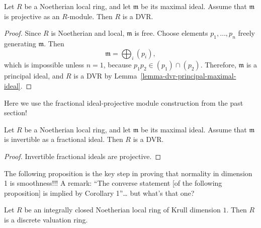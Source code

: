 \begin{proposition}
\label{proposition-projective-maximal-ideal-dvr}
Let $R$ be a Noetherian local ring, and let
$\mathfrak{m}$ be its maximal ideal. Assume
that $\mathfrak{m}$ is projective as an
$R$-module. Then $R$ is a DVR.
\end{proposition}

\begin{proof}
Since $R$ is Noetherian and local,
$\mathfrak{m}$ is free. Choose elements
$p_1,\dots,p_n$ freely generating
$\mathfrak{m}$. Then
$$
\mathfrak{m}=\bigoplus_i (p_i),
$$
which is impossible unless $n=1$, because
$p_1p_2\in (p_1)\cap(p_2)$. Therefore,
$\mathfrak{m}$ is a principal ideal, and
$R$ is a DVR by Lemma~\ref{lemma-dvr-principal-maximal-ideal}.
\end{proof}

\noindent
Here we use the fractional ideal-projective
module construction from the past section!

\begin{corollary}
\label{lemma-invertible-maximal-ideal-dvr}
Let $R$ be a Noetherian local ring, and let
$\mathfrak{m}$ be its maximal ideal. Assume
that $\mathfrak{m}$ is invertible as a
fractional ideal. Then $R$ is a DVR.
\end{corollary}

\begin{proof}
Invertible fractional ideals are projective.
\end{proof}

\noindent
The following proposition is the
key step in proving that
normality in dimension 1 is smoothness!!!
A remark: ``The converse statement
[of the following proposition]
is implied by Corollary 1''…
but what's that one?

\begin{proposition}
\label{proposition-integrally-closed-dvr}
Let $R$ be an integrally closed Noetherian
local ring of Krull dimension $1$. Then $R$
is a discrete valuation ring.
\end{proposition}

